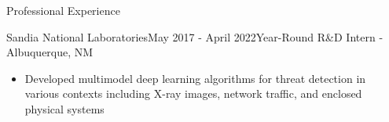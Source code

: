 \documentclass[11pt]{resume} %
\begin{document}
\begin{rSection}{Professional Experience}
\begin{rSubsection}{Sandia National Laboratories}{May 2017 - April 2022}{Year-Round R\&D Intern - Albuquerque, NM}
\begin{itemize}[label={}]
    \setlength\itemsep{0em}
    \item Developed multimodel deep learning algorithms for threat detection in various contexts including X-ray images,
    network traffic, and enclosed physical systems
\end{itemize}

\end{rSubsection}
\end{rSection}

\end{document}
